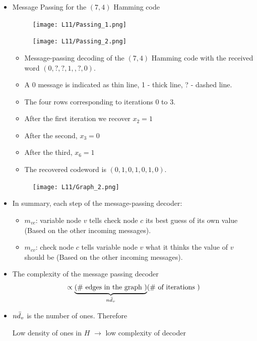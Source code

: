 \documentclass[12pt]{article}
\begin{document}
\begin{itemize}
    \item {\large Message Passing for the $(7,4)$ Hamming code }
    \begin{figure}[H]
    \centering
    \texttt{[image: L11/Passing\_1.png]}
    \end{figure}
    
    \begin{figure}[H]
    \centering
    \texttt{[image: L11/Passing\_2.png]}
    \end{figure}
    \begin{itemize}
        \item Message-passing decoding of the $(7,4)$ Hamming code with the received word $(0,?,?,1,,?,0)$.
        \item A 0 message is indicated as thin line, 1 - thick line, ? - dashed line.
        \item The four rows corresponding to iterations 0 to 3.
        \item After the first iteration we recover $x_2=1$
        \item After the second, $x_3=0$
        \item After the third, $x_6=1$
        \item The recovered codeword is $(0,1,0,1,0,1,0)$.
    \end{itemize}
    \begin{figure}[H]
        \centering
        \texttt{[image: L11/Graph\_2.png]}
    \end{figure}
    \item In summary, each step of the message-passing decoder:
    \begin{itemize}
        \item $m_{v c }$: variable node $v$ tells check node $c$ its best guess of its own value (Based on the other incoming messages).
        \item $m_{c v}$: check node $c$ tells variable node $v$ what it thinks the value of $v$ should be (Based on the other incoming messages).
    \end{itemize}
    \item The complexity of the message passing decoder 
    \[
    \propto  \underbrace{(\textrm{\# edges in the graph })}_{n\Bar{d}_v}(\textrm{\# of iterations })
    \]
    \item ${n\Bar{d}_v}$ is the number of ones. Therefore
    \begin{center}
        Low density of ones in $H$ $\longrightarrow$ low complexity of decoder
    \end{center}
\end{itemize}
\end{document}
